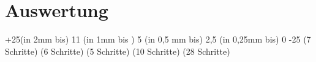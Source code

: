 \section{Auswertung}
+25(in 2mm bis) 11     (in 1mm bis ) 5     (in 0,5 mm bis) 2,5     (in 0,25mm bis) 0      -25
            (7 Schritte)        (6 Schritte)        (5 Schritte)            (10 Schritte)
                                            (28 Schritte)